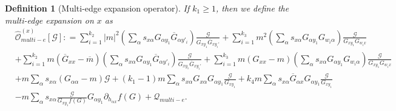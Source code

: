\documentclass{article}
\newcommand{\1}{\mathds{1}}
\numberwithin{equation}{section}
\newcommand{\al}{\alpha}
\renewcommand{\cal}{\mathcal}
\newcommand{\wh}{\widehat}
\renewcommand{\geq}{\geqslant}
\renewcommand{\ge}{\geq}
\theoremstyle{plain} %
\newtheorem{definition}[theorem]{Definition}
\theoremstyle{remark}
\begin{document}
\begin{definition} [Multi-edge expansion operator]
 	\medskip
 	 If $k_1\ge 1$, then we define the multi-edge expansion on $x$ as 
 	\begin{align} 
 		& \wh{\cal O}_{multi-e}^{(x)} \left[\cal G\right] : = \sum_{i=1}^{k_2}|m|^2  \left( \sum_\al s_{x\al }G_{\al y_1} \overline G_{\al y'_i}\right)\frac{\cal G}{G_{x y_1} \overline G_{xy_i'}}   + \sum_{i=1}^{k_3} m^2 \left(\sum_\al s_{x\al }G_{\al y_1} G_{w_i \al} \right)\frac{\cal G}{G_{xy_1}G_{w_i x}} \nonumber \\
 		& + \sum_{i=1}^{k_2}m  (\overline G_{xx} -\overline m) \left( \sum_\al s_{x\al }G_{\al y_1} \overline G_{\al y'_i}\right)\frac{\cal G}{G_{x y_1} \overline G_{xy_i'}}   + \sum_{i=1}^{k_3} m  (G_{xx}-m) \left(\sum_\al s_{x\al }G_{\al y_1} G_{w_i \al} \right)\frac{\cal G}{G_{xy_1}G_{w_i x}} \nonumber \\
 		& +  m   \sum_\al s_{x\al }\left(G_{\al \al}-m\right) \cal G  +(k_1-1) m  \sum_\al s_{x\al } G_{x \al} G_{\al y_1}\frac{ \cal G}{G_{xy_1}}  + k_4 m   \sum_\al s_{x\al }\overline G_{\al x} G_{\al y_1}  \frac{\cal G}{G_{xy_1}}  \nonumber\\
 		& - m    \sum_\al s_{x\al } \frac{\cal G}{G_{x y_1}f(G)}G_{\al y_1}\partial_{ h_{\al x}}f (G)  +\cal Q_{multi-e} .\label{Oe1x}
 	\end{align}

\end{definition}
\end{document}
